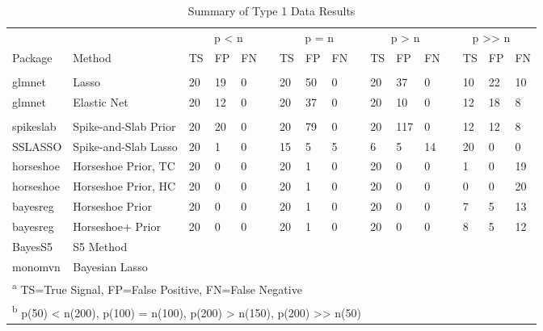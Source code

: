 \documentclass[
  11pt,
]{article}
\begin{document}
\begin{table}[!h]

\caption{\label{tab:Results T1}Summary of Type 1 Data Results}
\centering
\fontsize{8.5}{10.5}\selectfont
\begin{tabular}[t]{>{}l|>{}l|>{}l|>{}l|>{}l|>{}l|>{}l|>{}l|>{}l|>{}l|>{}l|>{}l|>{}l|>{}l|>{}l|>{}l|>{}l|}
\toprule
\multicolumn{2}{c}{ } & \multicolumn{4}{c}{p < n} & \multicolumn{4}{c}{p = n} & \multicolumn{3}{c}{p > n} & \multicolumn{4}{c}{p >> n} \\
\cmidrule(l{3pt}r{3pt}){3-6} \cmidrule(l{3pt}r{3pt}){7-10} \cmidrule(l{3pt}r{3pt}){11-13} \cmidrule(l{3pt}r{3pt}){14-17}
Package & Method & TS & FP & FN &  & TS & FP & FN &  & TS & FP & FN &  & TS & FP & FN\\
\midrule
\addlinespace[0.3em]
\multicolumn{17}{l}{\textbf{Frequentist Methods}}\\
\hspace{1em}glmnet & Lasso & 20 & 19 & 0 &  & 20 & 50 & 0 &  & 20 & 37 & 0 &  & 10 & 22 & 10\\
\hspace{1em}glmnet & Elastic Net & 20 & 12 & 0 &  & 20 & 37 & 0 &  & 20 & 10 & 0 &  & 12 & 18 & 8\\
\addlinespace[0.3em]
\multicolumn{17}{l}{\textbf{Bayesian Methods}}\\
\hspace{1em}spikeslab & Spike-and-Slab Prior & 20 & 20 & 0 &  & 20 & 79 & 0 &  & 20 & 117 & 0 &  & 12 & 12 & 8\\
\hspace{1em}SSLASSO & Spike-and-Slab Lasso & 20 & 1 & 0 &  & 15 & 5 & 5 &  & 6 & 5 & 14 &  & 20 & 0 & 0\\
\hspace{1em}horseshoe & Horseshoe Prior, TC & 20 & 0 & 0 &  & 20 & 1 & 0 &  & 20 & 0 & 0 &  & 1 & 0 & 19\\
\hspace{1em}horseshoe & Horseshoe Prior, HC & 20 & 0 & 0 &  & 20 & 1 & 0 &  & 20 & 0 & 0 &  & 0 & 0 & 20\\
\hspace{1em}bayesreg & Horseshoe Prior & 20 & 0 & 0 &  & 20 & 1 & 0 &  & 20 & 0 & 0 &  & 7 & 5 & 13\\
\hspace{1em}bayesreg & Horseshoe+ Prior & 20 & 0 & 0 &  & 20 & 1 & 0 &  & 20 & 0 & 0 &  & 8 & 5 & 12\\
\hspace{1em}BayesS5 & S5 Method &  &  &  &  &  &  &  &  &  &  &  &  &  &  & \\
\hspace{1em}monomvn & Bayesian Lasso &  &  &  &  &  &  &  &  &  &  &  &  &  &  & \\
\bottomrule
\multicolumn{17}{l}{\textsuperscript{a} TS=True Signal, FP=False Positive, FN=False Negative}\\
\multicolumn{17}{l}{\textsuperscript{b} p(50) < n(200), p(100) = n(100), p(200) > n(150), p(200) >> n(50)}\\
\end{tabular}
\end{table}
\end{document}
